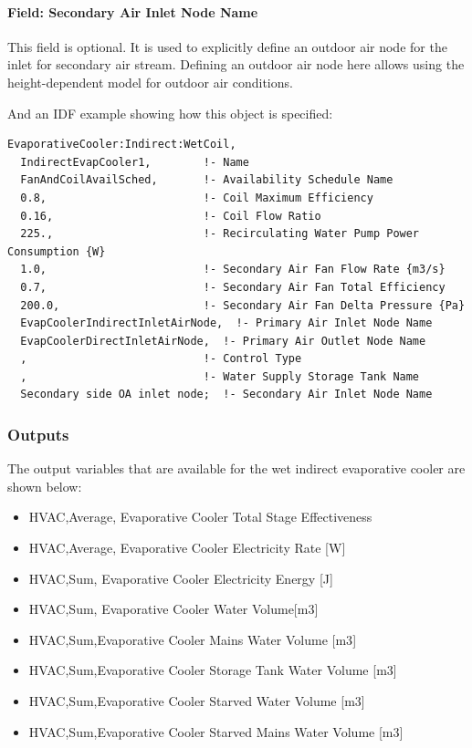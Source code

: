 \paragraph{Field: Secondary Air Inlet Node Name}\label{field-secondary-air-inlet-node-name-1-000}

This field is optional. It is used to explicitly define an outdoor air node for the inlet for secondary air stream. Defining an outdoor air node here allows using the height-dependent model for outdoor air conditions.

And an IDF example showing how this object is specified:

\begin{lstlisting}
EvaporativeCooler:Indirect:WetCoil,
  IndirectEvapCooler1,        !- Name
  FanAndCoilAvailSched,       !- Availability Schedule Name
  0.8,                        !- Coil Maximum Efficiency
  0.16,                       !- Coil Flow Ratio
  225.,                       !- Recirculating Water Pump Power Consumption {W}
  1.0,                        !- Secondary Air Fan Flow Rate {m3/s}
  0.7,                        !- Secondary Air Fan Total Efficiency
  200.0,                      !- Secondary Air Fan Delta Pressure {Pa}
  EvapCoolerIndirectInletAirNode,  !- Primary Air Inlet Node Name
  EvapCoolerDirectInletAirNode,  !- Primary Air Outlet Node Name
  ,                           !- Control Type
  ,                           !- Water Supply Storage Tank Name
  Secondary side OA inlet node;  !- Secondary Air Inlet Node Name
\end{lstlisting}

\subsubsection{Outputs}\label{outputs-3-006}

The output variables that are available for the wet indirect evaporative cooler are shown below:

\begin{itemize}
\item
  HVAC,Average, Evaporative Cooler Total Stage Effectiveness
\item
  HVAC,Average, Evaporative Cooler Electricity Rate {[}W{]}
\item
  HVAC,Sum, Evaporative Cooler Electricity Energy {[}J{]}
\item
  HVAC,Sum, Evaporative Cooler Water Volume{[}m3{]}
\item
  HVAC,Sum,Evaporative Cooler Mains Water Volume {[}m3{]}
\item
  HVAC,Sum,Evaporative Cooler Storage Tank Water Volume {[}m3{]}
\item
  HVAC,Sum,Evaporative Cooler Starved Water Volume {[}m3{]}
\item
  HVAC,Sum,Evaporative Cooler Starved Mains Water Volume {[}m3{]}
\end{itemize}

